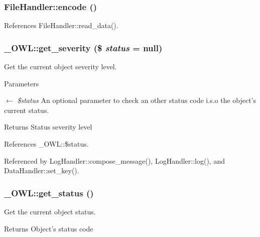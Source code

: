 \subsubsection[{encode}]{\setlength{\rightskip}{0pt plus 5cm}FileHandler::encode ()}\label{classFileHandler_aa29360bf94fd54d906256561f33d93ad}


References FileHandler::read\_\-data().

\subsubsection[{get\_\-severity}]{\setlength{\rightskip}{0pt plus 5cm}\_\-OWL::get\_\-severity (\$ {\em status} = {\ttfamily null})}\label{class__OWL_adf9509ef96858be7bdd9414c5ef129aa}
Get the current object severity level.


\begin{DoxyParams}{Parameters}
\item[\mbox{$\leftarrow$} {\em \$status}]An optional parameter to check an other status code i.s.o the object's current status. \end{DoxyParams}
\begin{DoxyReturn}{Returns}
Status severity level 
\end{DoxyReturn}


References \_\-OWL::\$status.



Referenced by LogHandler::compose\_\-message(), LogHandler::log(), and DataHandler::set\_\-key().

\subsubsection[{get\_\-status}]{\setlength{\rightskip}{0pt plus 5cm}\_\-OWL::get\_\-status ()}\label{class__OWL_a99ec771fa2c5c279f80152cc09e489a8}
Get the current object status.

\begin{DoxyReturn}{Returns}
Object's status code 
\end{DoxyReturn}


